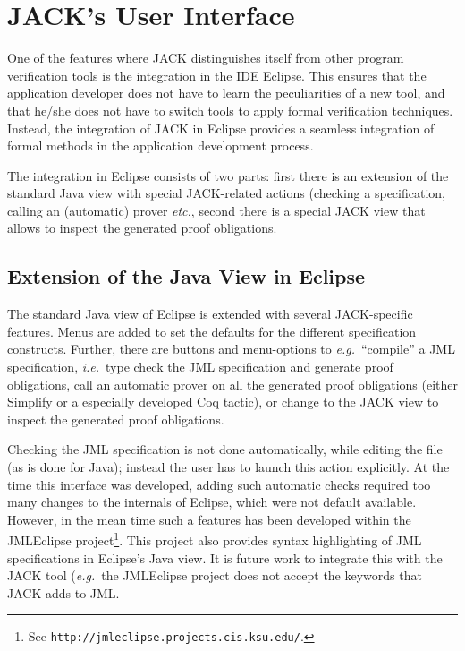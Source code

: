 \section{JACK's User Interface}\label{SecUI}

One of the features where JACK distinguishes itself from other program
verification tools is the integration in the IDE Eclipse. This ensures
that the application developer does not have to learn the
peculiarities of a new tool, and that he/she does not have to switch
tools to apply formal verification techniques. Instead, the
integration of JACK in Eclipse provides a seamless integration of
formal methods in the application development process. 

The integration in Eclipse consists of two parts: first there is an
extension of the standard Java view with special JACK-related actions
(checking a specification, calling an (automatic) prover \emph{etc.},
second there is a special JACK view that allows to inspect the
generated proof obligations.

\subsection{Extension of the Java View in Eclipse}

The standard Java view of Eclipse is extended with several
JACK-specific features. Menus are added to set the defaults for the
different specification constructs. Further, there are buttons and
menu-options to \emph{e.g.}\ ``compile'' a JML specification,
\emph{i.e.}\ type check the JML specification and generate proof
obligations, call an automatic prover on all the generated proof
obligations (either Simplify or a especially developed Coq tactic), or
change to the JACK view to inspect the generated proof obligations. 

Checking the JML specification is not done automatically, while
editing the file (as is done for Java); instead the user has to launch
this action explicitly. At the time this interface was developed,
adding such automatic checks required too many changes to the
internals of Eclipse, which were not default available. However, in
the mean time such a features has been developed within the JMLEclipse
project\footnote{See
\texttt{http://jmleclipse.projects.cis.ksu.edu/}.}. This project also
provides syntax highlighting of JML specifications in Eclipse's Java
view. It is future work to integrate this with the JACK tool
(\emph{e.g.}\ the JMLEclipse project does not accept the keywords that
JACK adds to JML. 

